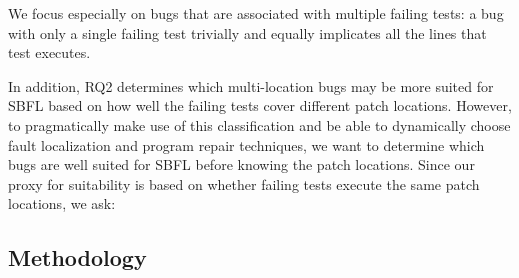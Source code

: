 \documentclass[10pt,journal,compsoc]{IEEEtran}
\begin{document}





We focus especially on bugs that are associated with multiple failing tests: a bug
with only a single failing test trivially and equally implicates all the lines
that test executes. 


In addition, RQ2 determines which multi-location bugs may be more suited for SBFL 
based on how well the failing tests cover different patch locations. However, to pragmatically 
make use of this classification and be able to dynamically choose fault localization and program 
repair techniques, we want to determine which bugs are well suited for SBFL before knowing 
the patch locations. Since our proxy for suitability is based on whether failing tests execute 
the same patch locations, we ask:


\subsection{Methodology}
\end{document}
